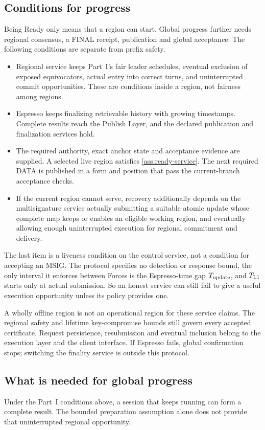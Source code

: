 \documentclass[11pt,a4paper]{article}
\newcounter{protocol}
\begin{document}
\subsection{Conditions for progress}
\label{sec:progress}
Being Ready only means that a region can start. Global progress further
needs regional consensus, a FINAL receipt, publication and global
acceptance. The following conditions are separate from prefix safety.
\begin{itemize}
\item Regional service keeps Part~I's fair leader schedules, eventual
exclusion of exposed equivocators, actual entry into correct turns, and
uninterrupted commit opportunities. These are conditions inside a region,
not fairness among regions.
\item Espresso keeps finalizing retrievable history with growing
timestamps. Complete results reach the Publish Layer, and the declared
publication and finalization services hold.
\item The required authority, exact anchor state and acceptance evidence
are supplied. A selected live region satisfies \cref{ass:ready-service}.
The next required DATA is published in a form and position that pass the
current-branch acceptance checks.
\item If the current region cannot serve, recovery additionally depends
on the multisignature service actually submitting a suitable atomic
update whose complete map keeps or enables an eligible working region,
and eventually allowing
enough uninterrupted execution for regional commitment and delivery.
\end{itemize}
The last item is a liveness condition on the control service, not a
condition for accepting an MSIG. The protocol specifies no detection or
response bound, the only interval it enforces between Forces is the
Espresso-time gap $T_{\rm update}$, and $T_{\rm L1}$ starts only at actual
submission. So an honest service can still fail to
give a useful execution opportunity unless its policy provides one.

A wholly offline region is not an operational region for these service
claims. The regional safety and lifetime key-compromise bounds still
govern every accepted certificate. Request persistence, resubmission and
eventual inclusion belong to the execution layer and the client
interface. If Espresso fails, global confirmation stops; switching the
finality service is outside this protocol.

\subsection{What is needed for global progress}
\label{sec:global-progress}
Under the Part~I conditions above, a session that keeps running can form
a complete result. The bounded preparation assumption alone does not
provide that uninterrupted regional opportunity.
\end{document}
